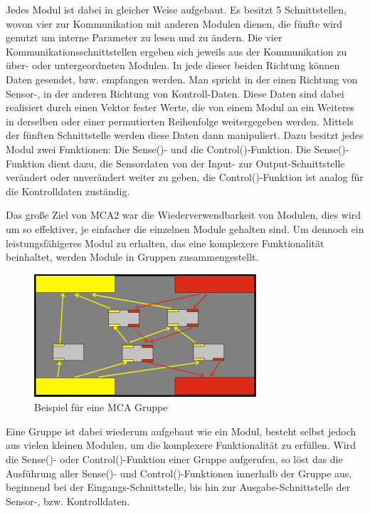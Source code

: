 Jedes Modul ist dabei in gleicher Weise aufgebaut. Es besitzt 5 Schnittstellen, wovon vier zur Kommunikation mit anderen Modulen dienen, die fünfte wird genutzt um interne Parameter zu lesen und zu ändern. Die vier Kommunikationsschnittstellen ergeben sich jeweils aus der Kommunikation zu über- oder untergeordneten Modulen. In jede dieser beiden Richtung können Daten gesendet, bzw. empfangen werden. Man spricht in der einen Richtung von Sensor-, in der anderen Richtung von Kontroll-Daten. Diese Daten sind dabei realisiert durch einen Vektor fester Werte, die von einem Modul an ein Weiteres in derselben oder einer permutierten Reihenfolge weitergegeben werden. Mittels der fünften Schnittstelle werden diese Daten dann manipuliert. Dazu besitzt jedes Modul zwei Funktionen: Die Sense()- und die Control()-Funktion. Die Sense()-Funktion dient dazu, die Sensordaten von der Input- zur Output-Schnittstelle verändert oder unverändert weiter zu geben, die Control()-Funktion ist analog für die Kontrolldaten zuständig.

Das große Ziel von MCA2 war die Wiederverwendbarkeit von Modulen, dies wird um so effektiver, je einfacher die einzelnen Module gehalten sind. Um dennoch ein leistungsfähigeres Modul zu erhalten, das eine komplexere Funktionalität beinhaltet, werden Module in Gruppen zusammengestellt. 

\begin{figure}[h]
	\center
	\includegraphics[scale=2.0]{graphics/mcagroup.png}
	\caption{\label{fig:MCA-Gruppe} Beispiel für eine MCA Gruppe}
\end{figure}


Eine Gruppe ist dabei wiederum aufgebaut wie ein Modul, besteht selbst jedoch aus vielen kleinen Modulen, um die komplexere Funktionalität zu erfüllen. Wird die Sense()- oder Control()-Funktion einer Gruppe aufgerufen, so löst das die Ausführung aller Sense()- und Control()-Funktionen innerhalb der Gruppe aus, beginnend bei der Eingangs-Schnittstelle, bis hin zur Ausgabe-Schnittstelle der Sensor-, bzw. Kontrolldaten.

